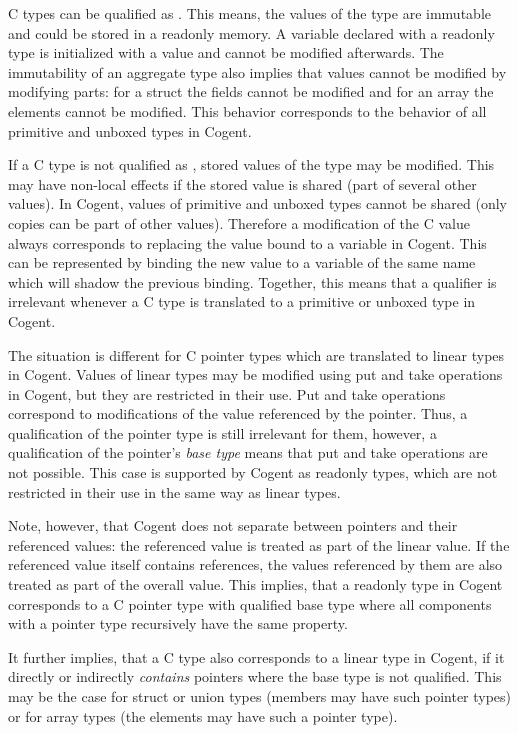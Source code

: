 C types can be qualified as . This means, the values of the type are immutable and could be stored in 
a readonly memory. A variable declared with a readonly type is initialized with a value and cannot be modified 
afterwards. The immutability of an aggregate type also implies that values cannot be modified by modifying parts: 
for a struct the fields cannot be modified and for an array the elements cannot be modified. This behavior corresponds 
to the behavior of all primitive and unboxed types in Cogent. 

If a C type is not qualified as , stored values of the type may be modified. This may have non-local
effects if the stored value is shared (part of several other values). In Cogent, values of primitive and unboxed types
cannot be shared (only copies can be part of other values). Therefore a modification of the C value always corresponds to
replacing the value bound to a variable in Cogent. This can be represented by binding the new value to a variable
of the same name which will shadow the previous binding. Together, this means that a  qualifier is
irrelevant whenever a C type is translated to a primitive or unboxed type in Cogent.

The situation is different for C pointer types which are translated to linear types in Cogent. Values of linear types
may be modified using put and take operations in Cogent, but they are restricted in their use. Put and take operations
correspond to modifications of the value referenced by the pointer. Thus, a  qualification of the pointer
type is still irrelevant for them, however, a  qualification of the pointer's \textit{base type} means
that put and take operations are not possible. This case is supported by Cogent as readonly types, which are not
restricted in their use in the same way as linear types.

Note, however, that Cogent does not separate between pointers and their referenced values: the referenced value
is treated as part of the linear value. If the referenced value itself contains references, the values referenced
by them are also treated as part of the overall value. This implies, that a readonly type in Cogent corresponds to
a C pointer type with  qualified base type where all components with a pointer type recursively have
the same property.

It further implies, that a C type also corresponds to a linear type in Cogent, if it directly or indirectly 
\textit{contains} pointers where the base type is not  qualified. This may be the case for struct or union
types (members may have such pointer types) or for array types (the elements may have such a pointer type).

